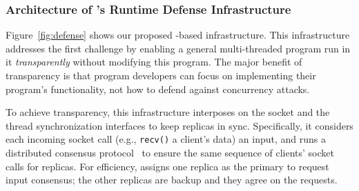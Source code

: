 \vspace{-.15in}\subsubsection{Architecture of \xxx's Runtime Defense 
Infrastructure} 
\label{sec:defense-arch}\vspace{-.075in}

Figure~\ref{fig:defense} shows our proposed \smr-based infrastructure. This infrastructure 
addresses the first challenge by enabling a general multi-threaded program run 
in it \emph{transparently} without modifying this program. The major benefit 
of transparency is that program developers can focus on implementing their 
program's functionality, not how to defend against concurrency attacks.

To achieve transparency, this infrastructure interposes on the socket and the 
thread synchronization interfaces to keep replicas in sync. Specifically, it 
considers each incoming socket call (e.g., \texttt{recv()} a client's data) an 
input, and runs a \paxos distributed consensus protocol~\cite{paxos:practical} 
to ensure the same sequence of clients' socket calls for replicas. For 
efficiency, \paxos assigns one replica as the primary to request input 
consensus; the other replicas are backup and they agree on the requests.




